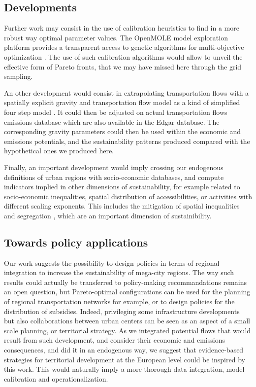 \documentclass{jimis-en}
\begin{document}
\subsection{Developments}

Further work may consist in the use of calibration heuristics to find in a more robust way optimal parameter values. The OpenMOLE model exploration platform provides a transparent access to genetic algorithms for multi-objective optimization \citep{reuillon2013openmole}. The use of such calibration algorithms would allow to unveil the effective form of Pareto fronts, that we may have missed here through the grid sampling.


An other development would consist in extrapolating transportation flows with a spatially explicit gravity and transportation flow model as a kind of simplified four step model \citep{mcnally2000four}. It could then be adjusted on actual transportation flows emissions database which are also available in the Edgar database. The corresponding gravity parameters could then be used within the economic and emissions potentials, and the sustainability patterns produced compared with the hypothetical ones we produced here.

Finally, an important development would imply crossing our endogenous definitions of urban regions with socio-economic databases, and compute indicators implied in other dimensions of sustainability, for example related to socio-economic inequalities, spatial distribution of accessibilities, or activities with different scaling exponents. This includes the mitigation of spatial inequalities and segregation \citep{tammaru2015multi}, which are an important dimension of sustainibility.



\subsection{Towards policy applications}


Our work suggests the possibility to design policies in terms of regional integration to increase the sustainability of mega-city regions. The way such results could actually be transferred to policy-making recommandations remains an open question, but Pareto-optimal configurations can be used for the planning of regional transportation networks for example, or to design policies for the distribution of subsidies. Indeed, privileging some infrastructure developments but also collaborations between urban centers can be seen as an aspect of a small scale planning, or territorial strategy. As we integrated potential flows that would result from such development, and consider their economic and emissions consequences, and did it in an endogenous way, we suggest that evidence-based strategies for territorial development at the European level could be inspired by this work. This would naturally imply a more thorough data integration, model calibration and operationalization.
\end{document}
